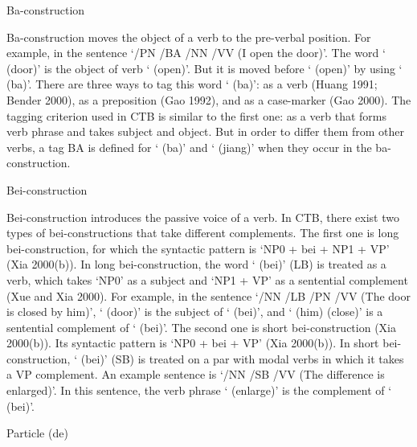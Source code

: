 \documentclass[english]{jnlp_1.4}
\renewcommand{\subsubsection}{}
\begin{document}
\subsubsection{Ba-construction}

Ba-construction moves the object of a verb to the pre-verbal position. For 
example, in the sentence `/PN /BA /NN 
/VV (I open the door)'. The word ` (door)' is the 
object of verb ` (open)'. But it is moved before 
` (open)' by using ` (ba)'. There are three ways to 
tag this word ` (ba)': as a verb (Huang 1991; Bender 2000), as a 
preposition (Gao 1992), and as a case-marker (Gao 2000). The tagging 
criterion used in CTB is similar to the first one: as a verb that forms verb 
phrase and takes subject and object. But in order to differ them from other 
verbs, a tag BA is defined for ` (ba)' and ` (jiang)' when 
they occur in the ba-construction.

\subsubsection{Bei-construction}

Bei-construction introduces the passive voice of a verb. In CTB, there exist 
two types of bei-constructions that take different complements. The first 
one is long bei-construction, for which the syntactic pattern is `NP0 + bei 
+ NP1 + VP' (Xia 2000(b)). In long bei-construction, the word 
` (bei)' (LB) is treated as a verb, which takes `NP0' as a 
subject and `NP1 + VP' as a sentential complement (Xue and Xia 2000). For 
example, in the sentence `/NN /LB 
/PN /VV 
(The door is closed by him)', ` (door)' is the subject of 
` (bei)', and ` (him) 
 (close)' is a sentential complement of 
` (bei)'. The second one is short bei-construction (Xia 
2000(b)). Its syntactic pattern is `NP0 + bei + VP' (Xia 2000(b)). In short 
bei-construction, ` (bei)' (SB) is treated on a par with modal 
verbs in which it takes a VP complement. An example sentence is 
`/NN /SB /VV 
(The difference is enlarged)'. In this sentence, the verb phrase 
` (enlarge)' is the complement of 
` (bei)'.


\subsubsection{Particle  (de)}
\end{document}
